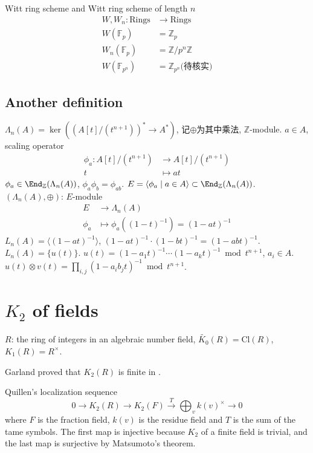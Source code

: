 Witt ring scheme and Witt ring scheme of length $n$
\begin{align*}
W, W_n\colon \mathrm{Rings} & \longrightarrow \mathrm{Rings}\\
W(\mathbb{F}_p) & =\mathbb{Z}_p\\
W_n(\mathbb{F}_p) & =\mathbb{Z}/p^n\mathbb{Z}\\
W(\mathbb{F}_{p^n}) & =\mathbb{Z}_{p^n} \text{(待核实)}
\end{align*}

\subsection{Another definition}
$\Lambda_n(A)=\ker((A[t]/(t^{n+1}))^*\longrightarrow A^*)$, 记$\oplus$为其中乘法, $\mathbb{Z}$-module. $a\in A$, scaling operator
\begin{align*}
\phi_a \colon A[t]/(t^{n+1}) &\longrightarrow A[t]/(t^{n+1})\\
t &\mapsto at
\end{align*}
$\phi_a \in \End_{\mathbb{Z}}(\Lambda_n(A))$, $\phi_a\phi_b=\phi_{ab}$. $E=\langle \phi_a \mid a\in A\rangle\subset \End_{\mathbb{Z}}(\Lambda_n(A))$.
$(\Lambda_n(A),\oplus)$: $E$-module
\begin{align*}
E &\longrightarrow \Lambda_n(A)\\
\phi_a &\mapsto \phi_a((1-t)^{-1})=(1-at)^{-1}
\end{align*}
$L_n(A)=\langle (1-at)^{-1}\rangle$, $(1-at)^{-1}\cdot (1-bt)^{-1}=(1-abt)^{-1}$. $L_n(A)=\{u(t)\}$. $u(t)=(1-a_1t)^{-1}\cdots (1-a_kt)^{-1} \bmod t^{n+1}$, $a_i\in A$. $u(t)\otimes v(t)=\prod_{i,j}(1-a_ib_jt)^{-1} \bmod t^{n+1}$.





\section{$K_2$ of fields}
$R$: the ring of integers in an algebraic number field, $\widetilde{K_0}(R)=\mathrm{Cl}(R)$, $K_1(R)=R^{\times}$.

Garland proved that $K_2(R)$ is finite in \cite{MR45:6785}.

Quillen's localization sequence 
\[0\longrightarrow K_2(R) \longrightarrow K_2(F) \overset{T}\longrightarrow \bigoplus_{v}k(v)^{\times}\longrightarrow 0\]
where $F$ is the fraction field, $k(v)$ is the residue field and $T$ is the sum of the tame symbols. The first map is injective because $K_2$ of a finite field is trivial, and the last map is surjective by Matsumoto's theorem.

